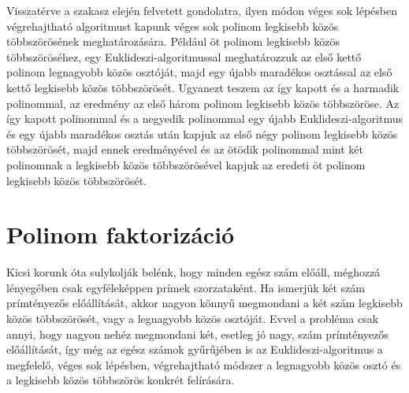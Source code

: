\documentclass[a4paper, showtrims]{memoir}
\theoremstyle{plain}
\theoremstyle{remark}
\theoremstyle{definition}
\begin{document}
Visszatérve a szakasz elején felvetett gondolatra,
ilyen módon véges sok lépésben végrehajtható algoritmust kapunk véges sok polinom legkisebb közös többszörösének meghatározására.
Például öt polinom legkisebb közös többszöröséhez,
egy Euklideszi-algoritmussal meghatározzuk az első kettő polinom legnagyobb közös osztóját,
majd egy újabb maradékos osztással az első kettő legkisebb közös többszörösét.
Ugyanezt teszem az így kapott és a harmadik polinommal,
az eredmény az első három polinom legkisebb közös többszöröse.
Az így kapott polinommal és a negyedik polinommal egy újabb Euklideszi-algoritmus és egy újabb maradékos osztás után kapjuk az első négy polinom legkisebb közös többszörösét,
majd ennek eredményével és az ötödik polinommal mint két polinomnak a legkisebb közös többszörösével kapjuk az eredeti öt polinom legkisebb közös többszörösét.
\section{Polinom faktorizáció}
Kicsi korunk óta sulykolják belénk, hogy minden egész szám előáll, méghozzá lényegében csak egyféleképpen
prímek szorzataként.
Ha ismerjük két szám prímtényezős előállítását, akkor nagyon könnyű megmondani a két szám legkisebb közös többszörösét,
vagy a legnagyobb közös osztóját.
Evvel a probléma csak annyi,
hogy nagyon nehéz megmondani két, esetleg jó nagy, szám prímtényezős előállítását,
így még az egész számok gyűrűjében is az Euklideszi-algoritmus a megfelelő, véges sok lépésben,
végrehajtható módszer a legnagyobb közös osztó és a legkisebb közös többszörös konkrét felírására.
\end{document}
